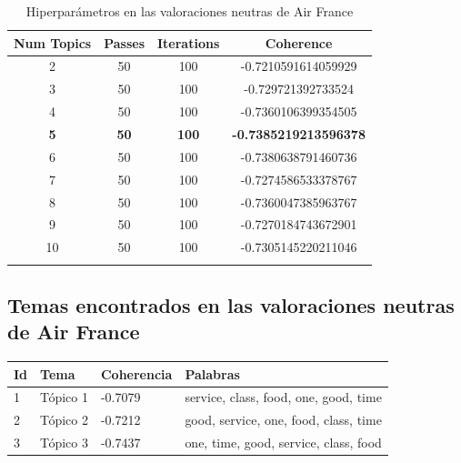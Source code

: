 \documentclass{report}
\begin{document}
{{                \label{tab:hiperparametros_air_france_neutras}
                \begin{longtable}{|c|c|c|c|}
                    \hline
                    \textbf{Num Topics} & \textbf{Passes} & \textbf{Iterations} & \textbf{Coherence} \\
                    \hline
                    2 & 50 & 100 & -0.7210591614059929 \\
                    \hline
                    3 & 50 & 100 & -0.729721392733524 \\
                    \hline
                    4 & 50 & 100 & -0.7360106399354505 \\
                    \hline
                    \textbf{5} & \textbf{50} & \textbf{100} & \textbf{-0.7385219213596378} \\
                    \hline
                    6 & 50 & 100 & -0.7380638791460736 \\
                    \hline
                    7 & 50 & 100 & -0.7274586533378767 \\
                    \hline
                    8 & 50 & 100 & -0.7360047385963767 \\
                    \hline
                    9 & 50 & 100 & -0.7270184743672901 \\
                    \hline
                    10 & 50 & 100 & -0.7305145220211046 \\
                    \hline
                    \caption{Hiperparámetros en las valoraciones neutras de Air France}
                \end{longtable}
            \clearpage\subsection{Temas encontrados en las valoraciones neutras de Air France}
                \label{tab:temas_air_france_neutras}
                \begin{longtable}{|p{1cm}|p{4cm}|p{4cm}|p{6cm}|}
                    \hline
                    \textbf{Id} & \textbf{Tema} & \textbf{Coherencia} & \textbf{Palabras} \\
                    \hline
                    1 & Tópico 1 & -0.7079 & service, class, food, one, good, time \\
                    \hline
                    2 & Tópico 2 & -0.7212 & good, service, one, food, class, time \\
                    \hline
                    3 & Tópico 3 & -0.7437 & one, time, good, service, class, food \\

\end{longtable}}}
\end{document}
